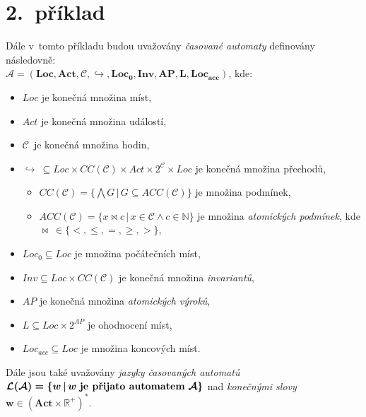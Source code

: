 \documentclass[a4paper, 11pt]{scrartcl}
\begin{document}
    \section*{2.~příklad}

    Dále v~tomto příkladu budou uvažovány \emph{časované automaty} definovány
    následovně: \\
    $ \boldsymbol{\mathcal{A} = (Loc, Act, \mathcal{C}, \hookrightarrow,
    Loc_0, Inv, AP, L, Loc_{acc})} $, kde:
    \begin{itemize}
        \item
            $ Loc $ je konečná množina míst,

        \item
            $ Act $ je konečná množina událostí,

        \item
            $ \mathcal{C} $~je konečná množina hodin,

        \item
            $ \hookrightarrow\ \subseteq Loc \times CC(\mathcal{C}) \times
            Act \times 2^\mathcal{C} \times Loc $ je konečná množina přechodů,

            \begin{itemize}
                \item
                    $ CC(\mathcal{C}) = \{\bigwedge G\,|\,G \subseteq
                    ACC(\mathcal{C})\} $ je množina podmínek,

                \item
                    $ ACC(\mathcal{C}) = \{x \bowtie c\,|\,x \in \mathcal{C}
                    \wedge c \in \mathbb{N}\} $ je množina \emph{atomických
                    podmínek}, kde $ \bowtie\ \in \{<, \leq, =, \geq, >\} $,
            \end{itemize}

        \item
            $ Loc_0 \subseteq Loc $ je množina počátečních míst,

        \item
            $ Inv \subseteq Loc \times CC(\mathcal{C}) $ je konečná množina
            \emph{invariantů},

        \item
            $ AP $ je konečná množina \emph{atomických výroků},

        \item
            $ L \subseteq Loc \times 2^{AP} $ je ohodnocení míst,

        \item
            $ Loc_{acc} \subseteq Loc $ je množina koncových míst.
    \end{itemize}
    Dále jsou také uvažovány \emph{jazyky časovaných automatů}
    $ \boldsymbol{\mathcal{L}(\mathcal{A}) = \{w\,|\,w\ \text{\textbf{je
    přijato automatem}}~\mathcal{A}\}} $ nad \emph{konečnými slovy}
    $ \boldsymbol{w \in (Act \times \mathbb{R}^+)^*} $. \\
\end{document}
